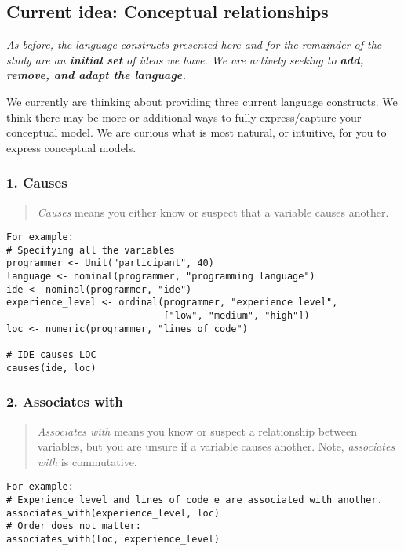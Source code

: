 \subsection*{Current idea: Conceptual relationships}

\emph{As before, the language constructs presented here and for the
remainder of the study are an \textbf{initial set} of ideas we have. We
are actively seeking to \textbf{add, remove, and adapt the language.}}

We currently are thinking about providing three current language
constructs. We think there may be more or additional ways to fully
express/capture your conceptual model. We are curious what is most
natural, or intuitive, for you to express conceptual models.

\subsubsection{1. Causes}

\begin{quote}
\emph{Causes} means you either know or suspect that a variable causes
another.
\end{quote}

\begin{verbatim}
For example:
# Specifying all the variables
programmer <- Unit("participant", 40)
language <- nominal(programmer, "programming language")
ide <- nominal(programmer, "ide")
experience_level <- ordinal(programmer, "experience level", 
                            ["low", "medium", "high"])
loc <- numeric(programmer, "lines of code")

# IDE causes LOC
causes(ide, loc)
\end{verbatim}

\subsubsection{2. Associates with}

\begin{quote}
\emph{Associates with} means you know or suspect a relationship between
variables, but you are unsure if a variable causes another. Note,
\emph{associates with} is commutative.
\end{quote}

\begin{verbatim}
For example:
# Experience level and lines of code e are associated with another.
associates_with(experience_level, loc)
# Order does not matter:
associates_with(loc, experience_level)
\end{verbatim}


